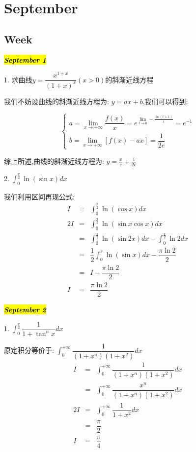 \chapter{September}
\section{Week }
\hl{\textbf{\textit{September 1}}}

1. 求曲线$y=\dfrac{x^{1+x}}{(1+x)^x}(x>0)$的斜渐近线方程
\begin{solution}

	我们不妨设曲线的斜渐近线方程为:  $y=ax+b$,我们可以得到:  
	
	$$\left\lbrace
	\begin{array}{l}
		a=\lim\limits_{x\rightarrow +\infty}\dfrac{f(x)}{x}=e^{\lim\limits_{t\rightarrow 0}-\frac{\ln(t+1)}{t}}=e^{-1}\\
		b=\lim\limits_{x\rightarrow +\infty}[f(x)-ax]=\dfrac{1}{2e}
	\end{array}
	\right. $$
	
	综上所述,曲线的斜渐近线方程为:  $y=\frac{x}{e}+\frac{1}{2e}$
\end{solution}

2. $\int_{0}^{\frac{\pi}{2}}\ln(\sin x)dx$
\begin{solution}

	我们利用区间再现公式:  
	\begin{eqnarray*}
		I&=&\int_{0}^{\frac{\pi}{2}}\ln(\cos x)dx\\
		2I&=&\int_{0}^{\frac{\pi}{2}}\ln(\sin x\cos x)dx\\
		&=&\int_{0}^{\frac{\pi}{2}}\ln(\sin 2x)dx-\int_{0}^{\frac{\pi}{2}}\ln2dx\\
		&=&\dfrac{1}{2}\int_{0}^{\pi}\ln(\sin x)dx-\dfrac{\pi \ln 2}{2}\\
		&=&I-\dfrac{\pi \ln 2}{2}\\
		I&=&\dfrac{\pi \ln 2}{2}
	\end{eqnarray*}
\end{solution}

\hl{\textbf{\textit{September 2}}}

1. $\int_{0}^{\frac{\pi}{2}}\dfrac{1}{1+\tan^{n}x}dx$
\begin{solution}

	原定积分等价于:  $\int_{0}^{+\infty}\dfrac{1}{(1+x^{n})(1+x^2)}dx$
	\begin{eqnarray*}
		I&=&\int_{0}^{+\infty}\dfrac{1}{(1+x^{n})(1+x^2)}dx\\
		&=&\int_{0}^{+\infty}\dfrac{x^n}{(1+x^{n})(1+x^2)}dx\\
		2I&=&\int_{0}^{+\infty}\dfrac{1}{1+x^2}dx\\
		&=&\dfrac{\pi}{2}\\
		I&=&\dfrac{\pi}{4}
	\end{eqnarray*}
\end{solution}

